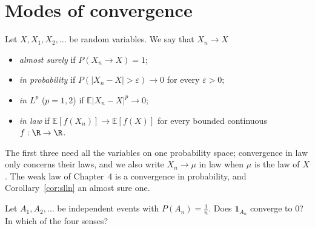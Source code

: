 \section{Modes of convergence}

\begin{definition}
Let $X,X_1,X_2,\ldots$ be random variables. We say that $X_n\to X$
\begin{itemize}
\item \emph{almost surely} if $P(X_n\to X)=1$;
\item \emph{in probability} if $P(|X_n-X|>\varepsilon)\to0$ for every $\varepsilon>0$;
\item \emph{in $L^p$} ($p=1,2$) if $\mathbb E|X_n-X|^p\to0$;
\item \emph{in law} if $\mathbb E[f(X_n)]\to\mathbb E[f(X)]$ for every bounded continuous $f:\R\to\R$.
\end{itemize}
\end{definition}

The first three need all the variables on one probability space; convergence in law only concerns their laws, and
we also write $X_n\to\mu$ in law when $\mu$ is the law of $X$. The weak law of Chapter~4 is a convergence in probability,
and Corollary~\ref{cor:slln} an almost sure one.

\begin{think}
Let $A_1,A_2,\ldots$ be independent events with $P(A_n)=\frac1n$. Does $\mathbf 1_{A_n}$ converge to $0$? In which of the four senses?
\end{think}

